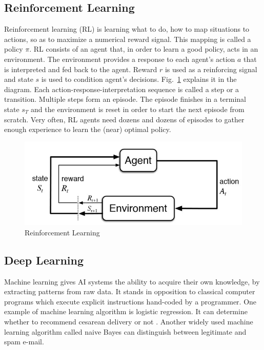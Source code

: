 \subsection{Reinforcement Learning}

Reinforcement learning (RL) is learning what to do, how to map situations to actions, so as to maximize a numerical reward signal. \cite{Book.RLAI} This mapping is called a policy $\pi$. RL consists of an agent that, in order to learn a good policy, acts in an environment. The environment provides a response to each agent's action $a$ that is interpreted and fed back to the agent. Reward $r$ is used as a reinforcing signal and state $s$ is used to condition agent's decisions. Fig.~\ref{Fig.RL} explains it in the diagram.
Each action-response-interpretation sequence is called a step or a transition. Multiple steps form an episode. The episode finishes in a terminal state $s_T$ and the environment is reset in order to start the next episode from scratch. Very often, RL agents need dozens and dozens of episodes to gather enough experience to learn the (near) optimal policy.

\begin{figure}[H]
\includegraphics[]{figures/RL.jpg}
\caption[Reinforcement Learning]{Reinforcement Learning \protect\cite{Book.RLAI}}
\label{Fig.RL}
\end{figure}


\subsection{Deep Learning}

Machine learning gives AI systems the ability to acquire their own knowledge, by extracting patterns from raw data. It stands in opposition to classical computer programs which execute explicit instructions hand-coded by a programmer.
One example of machine learning algorithm is logistic regression. It can determine whether to recommend cesarean delivery or not \cite{Study.Cesarean}. Another widely used machine learning algorithm called naive Bayes can distinguish between legitimate and spam e-mail.

